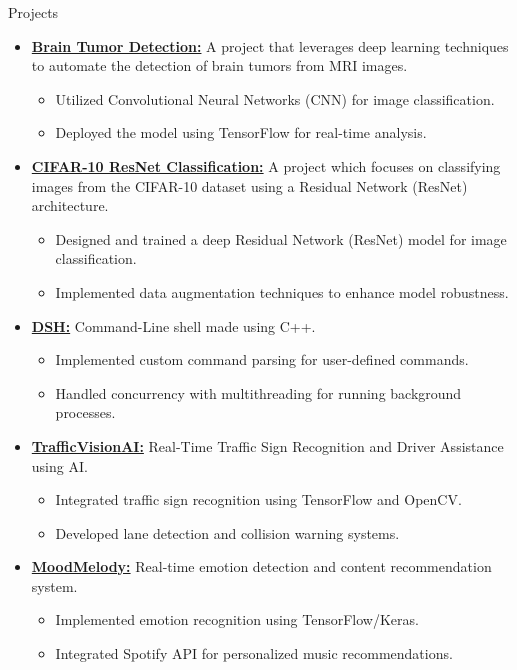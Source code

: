 \documentclass{resume} %
\begin{document}
\begin{rSection}{Projects}

\begin{itemize}  
    \item{\href{https://github.com/mystichronicle/Brain-Tumor-Detection}{{\bf Brain Tumor Detection:}} 
    A project that leverages deep learning techniques to automate the detection of brain tumors from MRI images.
    \begin{itemize}
        \item Utilized Convolutional Neural Networks (CNN) for image classification.
        \item Deployed the model using TensorFlow for real-time analysis.
    \end{itemize}}

    \item{\href{https://github.com/mystichronicle/cifar10-resnet-classification}{{\bf CIFAR-10 ResNet Classification:}} 
    A project which focuses on classifying images from the CIFAR-10 dataset using a Residual Network (ResNet) architecture.
    \begin{itemize}
        \item Designed and trained a deep Residual Network (ResNet) model for image classification.
        \item Implemented data augmentation techniques to enhance model robustness.
    \end{itemize}}
    
       \item {\href{https://github.com/mystichronicle/dsh}{{\bf DSH:}}
    Command-Line shell made using C++.
    \begin{itemize}
        \item Implemented custom command parsing for user-defined commands.
        \item Handled concurrency with multithreading for running background processes.
    \end{itemize}}
    
    \item{\href{https://github.com/mystichronicle/TrafficVisionAI}{{\bf TrafficVisionAI:}} 
    Real-Time Traffic Sign Recognition and Driver Assistance using AI.
    \begin{itemize}
        \item Integrated traffic sign recognition using TensorFlow and OpenCV.
        \item Developed lane detection and collision warning systems.
    \end{itemize}}
    
    \item{\href{https://github.com/mystichronicle/MoodMelody}{{\bf MoodMelody:}} 
    Real-time emotion detection and content recommendation system.
    \begin{itemize}
        \item Implemented emotion recognition using TensorFlow/Keras.
        \item Integrated Spotify API for personalized music recommendations.
    \end{itemize}}
\end{itemize}
\end{rSection}
\end{document}
